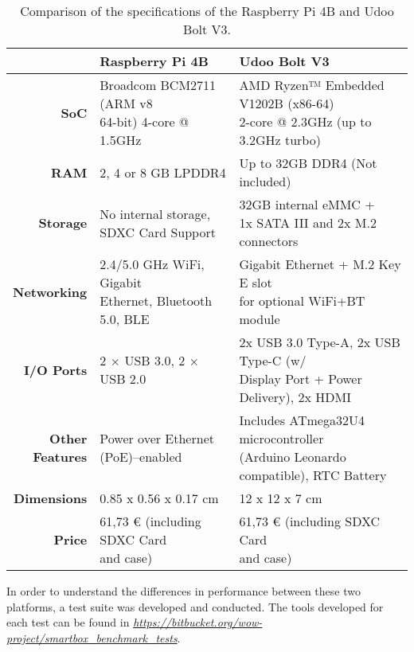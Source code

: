 \renewcommand{\arraystretch}{2}
\begin{table}[H]
    \centering
    \begin{tabular}{r|l|l}
        & \textbf{Raspberry Pi 4B}& \textbf{Udoo Bolt V3}  \\ \hline
        \textbf{SoC} &  \makecell{Broadcom BCM2711 (ARM v8 \\ 64-bit) 4-core @ 1.5GHz} & \makecell{AMD Ryzen™ Embedded V1202B (x86-64) \\ 2-core @ 2.3GHz (up to 3.2GHz turbo)}\\
        \textbf{RAM} & 2, 4 or 8 GB LPDDR4 & Up to 32GB DDR4 (Not included) \\ 
        \textbf{Storage} & \makecell{No internal storage, \\ SDXC Card Support} & \makecell{32GB internal eMMC + \\1x SATA III and 2x M.2 connectors}\\
        \textbf{Networking} & \makecell{2.4/5.0 GHz WiFi, Gigabit \\ Ethernet, Bluetooth 5.0, BLE} & \makecell{Gigabit Ethernet + M.2 Key E slot \\ for optional WiFi+BT module}\\ 
        \textbf{I/O Ports} & 2 × USB 3.0, 2 × USB 2.0 & \makecell{2x USB 3.0 Type-A, 2x USB Type-C (w/ \\ Display Port + Power Delivery), 2x HDMI} \\
        \makecell[r]{\textbf{Other} \\\textbf{Features}} & Power over Ethernet (PoE)–enabled & \makecell{Includes ATmega32U4 microcontroller\\ (Arduino Leonardo compatible), RTC Battery} \\   
        \textbf{Dimensions} & 0.85 x 0.56 x 0.17 cm & 12 x 12 x 7 cm \\
        \textbf{Price} & \makecell{61,73 € (including SDXC Card\\ and case)} & \makecell{61,73 € (including SDXC Card\\ and case)} \\
    \end{tabular}
    \caption{Comparison of the specifications of the Raspberry Pi 4B and Udoo Bolt V3.}
    \label{tab:comparsion-hardwareplatform}
\end{table}



In order to understand the differences in performance between these two platforms, a test suite was developed and conducted. The tools developed for each test can be found in \href{https://bitbucket.org/wow-project/smartbox_benchmark_tests}{\textit{https://bitbucket.org/wow-project/smartbox\_benchmark\_tests}}.

